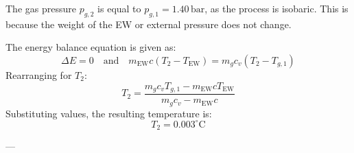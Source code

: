 The gas pressure \( p_{g,2} \) is equal to \( p_{g,1} = 1.40 \, \text{bar} \), as the process is isobaric. This is because the weight of the EW or external pressure does not change.  

The energy balance equation is given as:  
\[
\Delta E = 0 \quad \text{and} \quad m_{\text{EW}} c (T_2 - T_{\text{EW}}) = m_g c_v (T_2 - T_{g,1})  
\]  
Rearranging for \( T_2 \):  
\[
T_2 = \frac{m_g c_v T_{g,1} - m_{\text{EW}} c T_{\text{EW}}}{m_g c_v - m_{\text{EW}} c}  
\]  
Substituting values, the resulting temperature is:  
\[
T_2 = 0.003^\circ \text{C}  
\]  

---